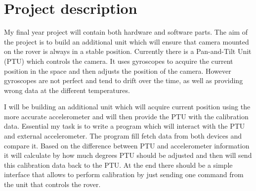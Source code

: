 \documentclass[11pt,fleqn,twoside]{article}
\begin{document}
\wordcount{}

\mmp

\setcounter{tocdepth}{3} %


\section{Project description}

My final year project will contain both hardware and software parts. The aim of the project is to build an additional unit which will ensure that camera mounted on the rover is always in a stable position. Currently there is a Pan-and-Tilt Unit (PTU) which controls the camera. It uses gyroscopes to acquire the current position in the space and then adjusts the position of the camera. However gyroscopes are not perfect and tend to drift over the time, as well as providing wrong data at the different temperatures. 

I will be building an additional unit which will acquire current position using the more accurate accelerometer and will then provide the PTU with the calibration data. Essential my task is to write a program which will interact with the PTU and external accelerometer. The program fill fetch data from both devices and compare it. Based on the difference between PTU and accelerometer information it will calculate by how much degrees PTU should be adjusted and then will send this calibration data back to the PTU. At the end there should be a simple interface that allows to perform calibration by just sending one command from the unit that controls the rover.    
\end{document}
